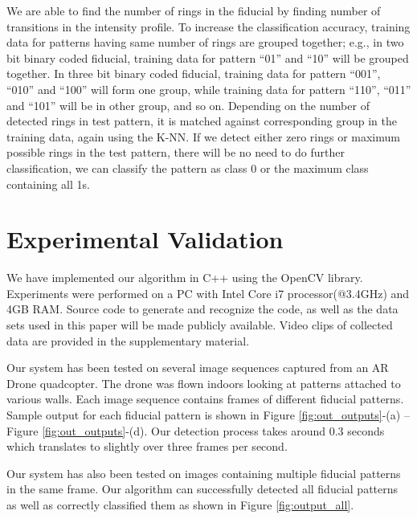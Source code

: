 \documentclass[10pt,twocolumn,letterpaper]{article}
\begin{document}
We are able to find the number of rings in the fiducial by finding
number of transitions in the intensity profile. To increase the classification
accuracy, training data for patterns having same number of rings are grouped together; e.g., in two bit
binary coded fiducial, training data for pattern ``01'' and ``10'' will be
grouped together. In three bit binary coded fiducial, training data for pattern
``001'', ``010'' and ``100'' will form one group, while training data for
pattern ``110'', ``011'' and ``101'' will be in other group, and so on. 
Depending on the number of detected rings in test pattern, it is matched
against corresponding group in the training data, again using  the K-NN. 
If we detect either zero rings or maximum possible
rings in the test pattern, there will be no need to do further classification, we
can classify the pattern as class 0 or the maximum class containing all 1s.

\section{Experimental Validation}

We have implemented our algorithm in C++ using the OpenCV library.
Experiments were performed on a PC with Intel Core i7 processor(@3.4GHz) and 4GB RAM.
Source code to generate and recognize the code, as well as the data sets used in
this paper will be made publicly available.  Video clips
of collected data are provided in the supplementary material.

Our system has been tested on several image sequences captured from an AR Drone
quadcopter.  The drone was flown indoors looking at patterns attached to
various walls. Each image sequence contains frames of different fiducial
patterns. Sample output for each fiducial pattern is shown in Figure
\ref{fig:out_outputs}-(a) -- Figure \ref{fig:out_outputs}-(d). Our detection
process takes around 0.3 seconds which translates to slightly over three frames per second.

Our system has also been tested on images containing multiple fiducial patterns
in the same frame. Our algorithm can successfully detected all fiducial patterns as
well as correctly classified them as shown in Figure \ref{fig:output_all}.
\end{document}
